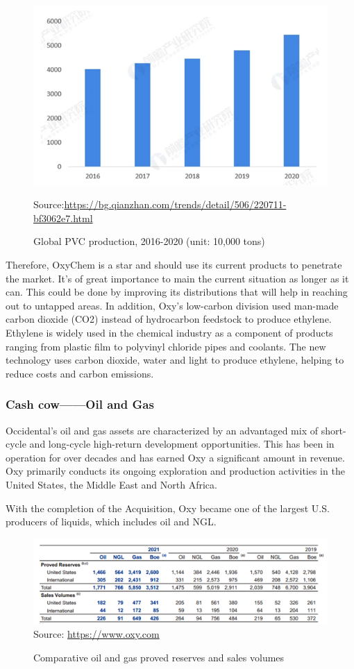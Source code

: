 \documentclass[
	a4paper, %
	12pt,%
]{CSSullivanBusinessReport}
\begin{document}
\begin{fullwidth}
\begin{figure}
    \centering
    \includegraphics{Images/Global PVC Production from 2016 to 2020.png}
    \caption{Global PVC production, 2016-2020 (unit: 10,000 tons)}
    Source:\url{https://bg.qianzhan.com/trends/detail/506/220711-bf3062e7.html}
    \label{PVC}
\end{figure}
Therefore, OxyChem is a star and should use its current products to penetrate the market. It's of great importance to main the current situation as longer as it can. This could be done by improving its distributions that will help in reaching out to untapped areas. In addition, Oxy's low-carbon division used man-made carbon dioxide (CO2) instead of hydrocarbon feedstock to produce ethylene. Ethylene is widely used in the chemical industry as a component of products ranging from plastic film to polyvinyl chloride pipes and coolants. The new technology uses carbon dioxide, water and light to produce ethylene, helping to reduce costs and carbon emissions.
\subsubsection{Cash cow——Oil and Gas}
Occidental’s oil and gas assets are characterized by an advantaged mix of short-cycle and long-cycle high-return development opportunities. This has been in operation for over decades and has earned Oxy a significant amount in revenue. Oxy primarily conducts its ongoing exploration and production activities in the United States, the Middle East and North Africa. \par
With the completion of the Acquisition, Oxy became one of the largest U.S. producers of liquids, which includes oil and NGL. 
\begin{figure}[H]
    \centering
    \caption{Comparative oil and gas proved reserves and sales volumes}
    \includegraphics{Images/Comparative oil and gas proved reserves and sales volumes.png}
    Source: \url{https://www.oxy.com}
    

\end{figure}
\end{fullwidth}
\end{document}
